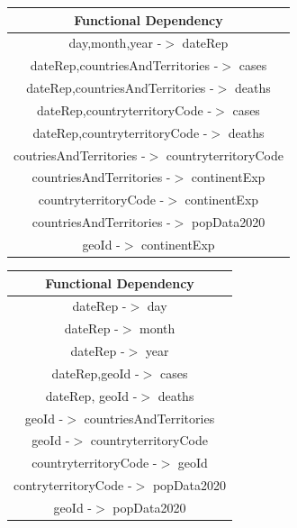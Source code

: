 \documentclass[12pt,oneside,a4paper,english]{article}
\begin{document}
\centering
 \begin{tabular}[t]{|c|} %
  \hline
  \textbf{Functional Dependency} \\ [0.5ex]
  \hline %
  day,month,year -$>$ dateRep\\ [0.5ex] 
  dateRep,countriesAndTerritories -$>$ cases\\ [0.5ex]
  dateRep,countriesAndTerritories -$>$ deaths\\ [0.5ex]
  dateRep,countryterritoryCode -$>$ cases\\ [0.5ex]
  dateRep,countryterritoryCode -$>$ deaths\\ [0.5ex]
  coutriesAndTerritories -$>$ countryterritoryCode\\ [0.5ex]
  countriesAndTerritories -$>$ continentExp\\ [0.5ex]
  countryterritoryCode -$>$ continentExp\\ [0.5ex]
  countriesAndTerritories -$>$ popData2020\\ [0.5ex]
  geoId -$>$ continentExp\\ [0.5ex]
  \hline
 \end{tabular}
 \begin{tabular}[t]{|c|} %
  \hline
  \textbf{Functional Dependency} \\ [0.5ex]
  \hline %
  dateRep -$>$ day\\ [0.5ex]
  dateRep -$>$ month\\ [0.5ex]
  dateRep -$>$ year\\ [0.5ex]
  dateRep,geoId -$>$ cases\\ [0.5ex]
  dateRep, geoId -$>$ deaths \\ [0.5ex]
  geoId -$>$ countriesAndTerritories\\ [0.5ex]
  geoId -$>$ countryterritoryCode\\ [0.5ex]
  countryterritoryCode -$>$ geoId\\ [0.5ex]
  contryterritoryCode -$>$ popData2020\\ [0.5ex]
  geoId -$>$ popData2020\\ [0.5ex]
  \hline
\end{tabular}

\pagebreak
\end{document}
